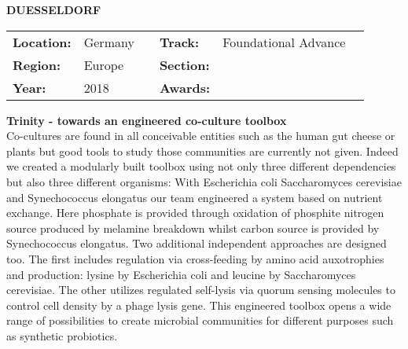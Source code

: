 \textbf{\uppercase{Duesseldorf}} \FloatBarrier \begin{table}[h] \begin{tabular}{lp{2.5cm}llll} \textbf{Location:} & Germany & \multicolumn{1}{|l}{} & \textbf{Track:}   & Foundational Advance \\ \textbf{Region:}   & Europe   & \multicolumn{1}{|l}{} & \textbf{Section:} &  \\ \textbf{Year:}     & 2018   & \multicolumn{1}{|l}{} & \textbf{Awards:}  & \end{tabular} \end{table} \FloatBarrier \noindent\textbf{Trinity - towards an engineered co-culture toolbox} \vspace{.2cm}\\ 
Co-cultures are found in all conceivable entities such as the human gut cheese or plants but good tools to study those communities are currently not given. Indeed we created a modularly built toolbox using not only three different dependencies but also three different organisms: With Escherichia coli Saccharomyces cerevisiae and Synechococcus elongatus our team engineered a system based on nutrient exchange. Here phosphate is provided through oxidation of phosphite nitrogen source produced by melamine breakdown whilst carbon source is provided by Synechococcus elongatus. Two additional independent approaches are designed too. The first includes regulation via cross-feeding by amino acid auxotrophies and production: lysine by Escherichia coli and leucine by Saccharomyces cerevisiae. The other utilizes regulated self-lysis via quorum sensing molecules to control cell density by a phage lysis gene. This engineered toolbox opens a wide range of possibilities to create microbial communities for different purposes such as synthetic probiotics.
\vspace{2cm}


